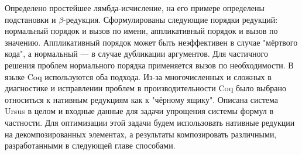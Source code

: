 \documentclass[../diploma.tex]{subfiles}
\begin{document}
Определено простейшее лямбда-исчисление, на его примере определены подстановки и $\beta$-редукция. Сформулированы следующие порядки редукций: нормальный порядок и вызов по имени, аппликативный порядок и вызов по значению. Аппликативный порядок может быть неэффективен в случае "мёртвого кода", а нормальный --- в случае дубликации аргументов. Для частичного решения проблем нормального порядка применяется вызов по необходимости. В языке Coq используются оба подхода. Из-за многочисленных и сложных в диагностике и исправлении проблем в производительности Coq было выбрано относиться к нативным редукциям как к "чёрному ящику". Описана система Ursus в целом и входные данные для задачи упрощения системы формул в частности. Для оптимизации этой задачи будем использовать нативные редукции на декомпозированных элементах, а результаты композировать различными, разработанными в следующей главе способами.
\end{document}
